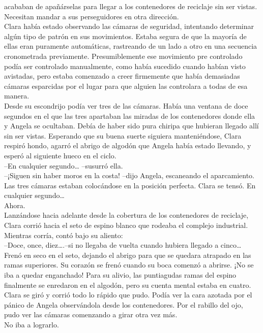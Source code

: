 acababan de apañárselas para llegar a los contenedores de reciclaje sin
ser vistas. Necesitan mandar a sus perseguidores en otra dirección.\\
Clara había estado observando las cámaras de seguridad, intentando
determinar algún tipo de patrón en sus movimientos. Estaba segura de que
la mayoría de ellas eran puramente automáticas, rastreando de un lado a
otro en una secuencia cronometrada previamente. Presumiblemente ese
movimiento pre controlado podía ser controlado manualmente, como había
sucedido cuando habían visto avistadas, pero estaba comenzado a creer
firmemente que había demasiadas cámaras esparcidas por el lugar para que
alguien las controlara a todas de esa manera.\\
Desde su escondrijo podía ver tres de las cámaras. Había una ventana de
doce segundos en el que las tres apartaban las miradas de los
contenedores donde ella y Angela se ocultaban. Debía de haber sido pura
chiripa que hubieran llegado allí sin ser vistas. Esperando que su buena
suerte siguiera manteniéndose, Clara respiró hondo, agarró el abrigo de
algodón que Angela había estado llevando, y esperó al siguiente hueco en
el ciclo.\\
--En cualquier segundo\ldots{} --susurró ella.\\
--¡Siguen sin haber moros en la costa! --dijo Angela, escaneando el
aparcamiento.\\
Las tres cámaras estaban colocándose en la posición perfecta. Clara se
tensó. En cualquier segundo\ldots{}\\
Ahora.\\
Lanzándose hacia adelante desde la cobertura de los contenedores de
reciclaje, Clara corrió hacia el seto de espino blanco que rodeaba el
complejo industrial. Mientras corría, contó bajo su aliento:\\
--Doce, once, diez\ldots{}.--si no llegaba de vuelta cuando hubiera
llegado a cinco\ldots{}\\
Frenó en seco en el seto, dejando el abrigo para que se quedara atrapado
en las ramas superiores. Su corazón se frenó cuando su boca comenzó a
abrirse. ¡No se iba a quedar enganchado! Para su alivio, las puntiagudas
ramas del espino finalmente se enredaron en el algodón, pero su cuenta
mental estaba en cuatro.\\
Clara se giró y corrió todo lo rápido que pudo. Podía ver la cara
azotada por el pánico de Angela observándola desde los contenedores. Por
el rabillo del ojo, pudo ver las cámaras comenzando a girar otra vez
más.\\
No iba a lograrlo.\\
